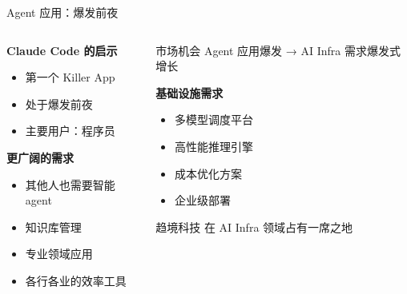 \documentclass[aspectratio=169,xcolor=dvipsnames]{beamer}
\begin{document}
\begin{frame}{Agent 应用：爆发前夜}
  \begin{columns}
    \begin{column}{0.48\textwidth}
      \textbf{Claude Code 的启示}
      \begin{itemize}
        \item 第一个 Killer App
        \item 处于爆发前夜
        \item 主要用户：程序员
      \end{itemize}

      \vspace{0.5cm}

      \textbf{更广阔的需求}
      \begin{itemize}
        \item 其他人也需要智能 agent
        \item 知识库管理
        \item 专业领域应用
        \item 各行各业的效率工具
      \end{itemize}
    \end{column}
    \begin{column}{0.48\textwidth}
      \begin{alertblock}{市场机会}
        Agent 应用爆发 → AI Infra 需求爆发式增长
      \end{alertblock}

      \vspace{0.5cm}

      \textbf{基础设施需求}
      \begin{itemize}
        \item 多模型调度平台
        \item 高性能推理引擎
        \item 成本优化方案
        \item 企业级部署
      \end{itemize}

      \vspace{0.3cm}

      \begin{exampleblock}{趋境科技}
        在 AI Infra 领域占有一席之地
      \end{exampleblock}
    \end{column}
  \end{columns}
\end{frame}
\end{document}
